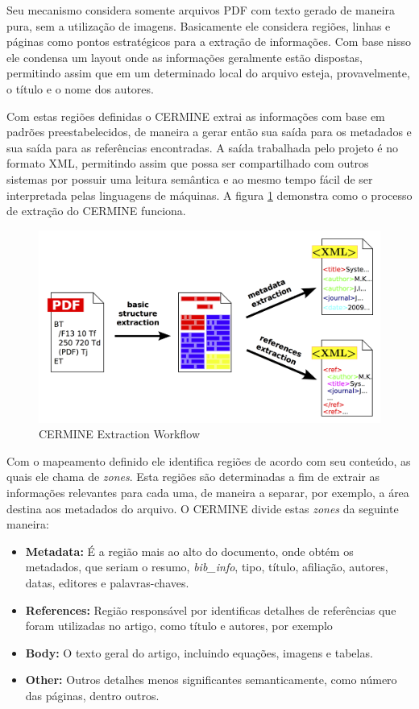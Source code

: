 \documentclass[
	12pt,               %
	openright,          %
	twoside,            %
	a4paper,            %
	english,            %
	brazil              %
	]{abntex2}
\begin{document}
Seu mecanismo considera somente arquivos PDF com texto gerado de maneira pura, sem a utilização de imagens. Basicamente ele considera regiões, linhas e páginas como pontos estratégicos para a extração de informações. Com base nisso ele condensa um layout onde as informações geralmente estão dispostas, permitindo assim que em um determinado local do arquivo esteja, provavelmente, o título e o nome dos autores. 

Com estas regiões definidas o CERMINE extrai as informações com base em padrões preestabelecidos, de maneira a gerar então sua saída para os metadados e sua saída para as referências encontradas. A saída trabalhada pelo projeto é no formato XML, permitindo assim que possa ser compartilhado com outros sistemas por possuir uma leitura semântica e ao mesmo tempo fácil de ser interpretada pelas linguagens de máquinas. A figura \ref{fig:cermine-workflow} demonstra como o processo de extração do CERMINE funciona.

\begin{figure}
\centering
\caption{CERMINE Extraction Workflow}
\label{fig:cermine-workflow}
\includegraphics[width=0.7\linewidth]{./assets/cermine}
\end{figure}

Com o mapeamento definido ele identifica regiões de acordo com seu conteúdo, as quais ele chama de \textit{zones}. Esta regiões são determinadas a fim de extrair as informações relevantes para cada uma, de maneira a separar, por exemplo, a área destina aos metadados do arquivo. O CERMINE divide estas \textit{zones} da seguinte maneira:

\begin{itemize}
\item \textbf{Metadata:} É a região mais ao alto do documento, onde obtém os metadados, que seriam o resumo, \textit{bib\_info}, tipo, título, afiliação, autores, datas, editores e palavras-chaves.
\item \textbf{References:} Região responsável por identificas detalhes de referências que foram utilizadas no artigo, como título e autores, por exemplo
\item \textbf{Body:} O texto geral do artigo, incluindo equações, imagens e tabelas.
\item \textbf{Other:} Outros detalhes menos significantes semanticamente, como número das páginas, dentro outros.
\end{itemize}
\end{document}
